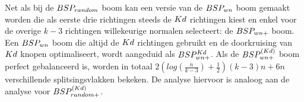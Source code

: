     Net als bij de $BSP_{random}$ boom kan een versie van de $BSP_{wn}$ boom gemaakt worden die als eerste drie richtingen steeds de $Kd$ richtingen kiest en enkel voor de overige $k - 3$ richtingen willekeurige normalen selecteert: de $BSP_{wn+}$ boom. Een $BSP_{wn}$ boom die altijd de $Kd$ richtingen gebruikt en de doorkruising van $Kd$ knopen optimaliseert, wordt aangeduid als $BSP^{Kd}_{wn+}$. Als de $BSP^{(Kd)}_{wn+}$ boom perfect gebalanceerd is, worden in totaal $2(log(\frac{n}{k-3}) + \frac{1}{2})(k-3)n + 6n$ verschillende splitsingsvlakken bekeken. De analyse hiervoor is analoog aan de analyse voor $BSP^{(Kd)}_{random+}$.



